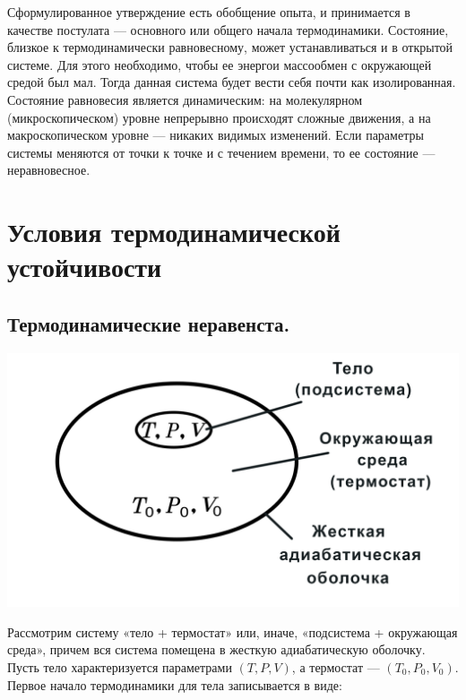 \documentclass[a4paper,14pt]{article} %
\begin{document}
Сформулированное утверждение есть обобщение опыта, и принимается
в качестве постулата — основного или общего начала термодинамики.
Состояние, близкое к термодинамически равновесному, может устанавливаться и в открытой системе. Для этого необходимо, чтобы ее энергои массообмен с окружающей средой был мал. Тогда данная система будет
вести себя почти как изолированная.
Состояние равновесия является динамическим: на молекулярном (микроскопическом) уровне непрерывно происходят сложные движения, а на
макроскопическом уровне — никаких видимых изменений.
Если параметры системы меняются от точки к точке и с течением
времени, то ее состояние — неравновесное.

\section{Условия термодинамической устойчивости}

\subsection{ Термодинамические неравенста.}

\begin{center}
	{\centering \includegraphics[scale=0.1]{PICTURE_1.jpg}}	
\end{center}

Рассмотрим систему «тело + термостат» или, иначе, «подсистема + окружающая среда», причем вся система помещена в жесткую адиабатическую оболочку. Пусть тело характеризуется параметрами $(T, P, V)$, а
термостат — $(T_0, P_0, V_0)$. Первое начало термодинамики для тела записывается в виде:
\end{document}
